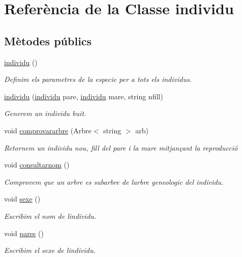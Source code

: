 \hypertarget{classindividu}{}\section{Referència de la Classe individu}
\label{classindividu}
\subsection*{Mètodes públics}
\begin{DoxyCompactItemize}
\item 
\hyperlink{classindividu_af1ba9dc86a04bff6b41ed2d1cf3202b9}{individu} ()
\begin{DoxyCompactList}\small\item\em Definim els parametres de la especie per a tots els individus. \end{DoxyCompactList}\item 
\hyperlink{classindividu_ad05b5a1094b6b85e3704bee2d9de4717}{individu} (\hyperlink{classindividu}{individu} pare, \hyperlink{classindividu}{individu} mare, string nfill)
\begin{DoxyCompactList}\small\item\em Generem un individu buit. \end{DoxyCompactList}\item 
void \hyperlink{classindividu_afe94f6bc70378a3b7607e99bd4b260f2}{comprovararbre} (Arbre$<$ string $>$ arb)
\begin{DoxyCompactList}\small\item\em Retornem un individu nou, fill del pare i la mare mitjançant la reproducció \end{DoxyCompactList}\item 
void \hyperlink{classindividu_a25a2d30b548c13a92bb2cbeacebc722c}{consultarnom} ()
\begin{DoxyCompactList}\small\item\em Comprovem que un arbre es subarbre de l\textquotesingle{}arbre geneologic del individu. \end{DoxyCompactList}\item 
void \hyperlink{classindividu_aef8e17be688e7e31270d5207aa008587}{sexe} ()
\begin{DoxyCompactList}\small\item\em Escribim el nom de l\textquotesingle{}individu. \end{DoxyCompactList}\item 
void \hyperlink{classindividu_ad7b6f532a96228f4ba7b9a948d7051c9}{pares} ()
\begin{DoxyCompactList}\small\item\em Escribim el sexe de l\textquotesingle{}individu. \end{DoxyCompactList}\item 

\end{DoxyCompactItemize}
